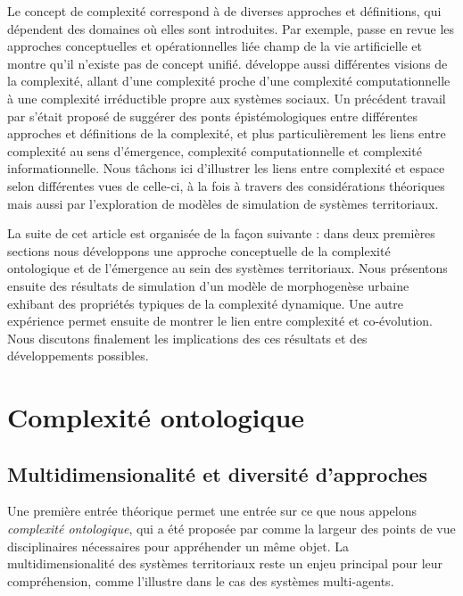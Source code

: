 \documentclass[11pt]{article}
\begin{document}
Le concept de complexité correspond à de diverses approches et définitions, qui dépendent des domaines où elles sont introduites. Par exemple, \cite{chu2008criteria} passe en revue les approches conceptuelles et opérationnelles liée champ de la vie artificielle et montre qu'il n'existe pas de concept unifié. \cite{deffuant2015visions} développe aussi différentes visions de la complexité, allant d'une complexité proche d'une complexité computationnelle à une complexité irréductible propre aux systèmes sociaux. Un précédent travail par \cite{raimbault2018relating} s'était proposé de suggérer des ponts épistémologiques entre différentes approches et définitions de la complexité, et plus particulièrement les liens entre complexité au sens d'émergence, complexité computationnelle et complexité informationnelle. Nous tâchons ici d'illustrer les liens entre complexité et espace selon différentes vues de celle-ci, à la fois à travers des considérations théoriques mais aussi par l'exploration de modèles de simulation de systèmes territoriaux.

La suite de cet article est organisée de la façon suivante : dans deux premières sections nous développons une approche conceptuelle de la complexité ontologique et de l'émergence au sein des systèmes territoriaux. Nous présentons ensuite des résultats de simulation d'un modèle de morphogenèse urbaine exhibant des propriétés typiques de la complexité dynamique. Une autre expérience permet ensuite de montrer le lien entre complexité et co-évolution. Nous discutons finalement les implications des ces résultats et des développements possibles.



\section{Complexité ontologique}


\subsection{Multidimensionalité et diversité d'approches}


Une première entrée théorique permet une entrée sur ce que nous appelons \emph{complexité ontologique}, qui a été proposée par \cite{pumain2003approche} comme la largeur des points de vue disciplinaires nécessaires pour appréhender un même objet. La multidimensionalité des systèmes territoriaux reste un enjeu principal pour leur compréhension, comme l'illustre \cite{perez2016agent} dans le cas des systèmes multi-agents.
\end{document}
